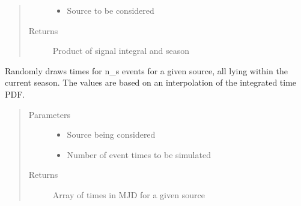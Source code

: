 \documentclass[letterpaper,10pt,english]{sphinxmanual}
\begin{document}
\begin{fulllineitems}
\begin{fulllineitems}
\begin{quote}
\begin{description}
\begin{itemize}
\item {} 
 \textendash{} Source to be considered

\end{itemize}

\item[{Returns}] \leavevmode
Product of signal integral and season

\end{description}\end{quote}

\end{fulllineitems}


\begin{fulllineitems}
\label{\detokenize{index:flarestack.core.time_pdf.TimePDF.register_subclass}}
\end{fulllineitems}


\begin{fulllineitems}
\label{\detokenize{index:flarestack.core.time_pdf.TimePDF.simulate_times}}
Randomly draws times for n\_s events for a given source,
all lying within the current season. The values are based on an
interpolation of the integrated time PDF.
\begin{quote}\begin{description}
\item[{Parameters}] \leavevmode\begin{itemize}
\item {} 
 \textendash{} Source being considered

\item {} 
 \textendash{} Number of event times to be simulated

\end{itemize}

\item[{Returns}] \leavevmode
Array of times in MJD for a given source


\end{description}
\end{quote}
\end{fulllineitems}
\end{fulllineitems}
\end{document}
